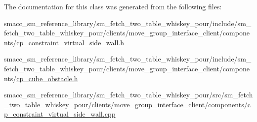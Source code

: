 The documentation for this class was generated from the following files\+:\begin{DoxyCompactItemize}
\item 
smacc\+\_\+sm\+\_\+reference\+\_\+library/sm\+\_\+fetch\+\_\+two\+\_\+table\+\_\+whiskey\+\_\+pour/include/sm\+\_\+fetch\+\_\+two\+\_\+table\+\_\+whiskey\+\_\+pour/clients/move\+\_\+group\+\_\+interface\+\_\+client/components/\hyperlink{sm__fetch__two__table__whiskey__pour_2include_2sm__fetch__two__table__whiskey__pour_2clients_2mo9cd1e6a6ae4038c653862869c4e5aa60}{cp\+\_\+constraint\+\_\+virtual\+\_\+side\+\_\+wall.\+h}\item 
smacc\+\_\+sm\+\_\+reference\+\_\+library/sm\+\_\+fetch\+\_\+two\+\_\+table\+\_\+whiskey\+\_\+pour/include/sm\+\_\+fetch\+\_\+two\+\_\+table\+\_\+whiskey\+\_\+pour/clients/move\+\_\+group\+\_\+interface\+\_\+client/components/\hyperlink{cp__cube__obstacle_8h}{cp\+\_\+cube\+\_\+obstacle.\+h}\item 
smacc\+\_\+sm\+\_\+reference\+\_\+library/sm\+\_\+fetch\+\_\+two\+\_\+table\+\_\+whiskey\+\_\+pour/src/sm\+\_\+fetch\+\_\+two\+\_\+table\+\_\+whiskey\+\_\+pour/clients/move\+\_\+group\+\_\+interface\+\_\+client/components/\hyperlink{sm__fetch__two__table__whiskey__pour_2src_2sm__fetch__two__table__whiskey__pour_2clients_2move__57a774cffb7062ac18eb3c417fc76699}{cp\+\_\+constraint\+\_\+virtual\+\_\+side\+\_\+wall.\+cpp}\end{DoxyCompactItemize}
